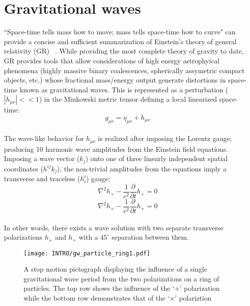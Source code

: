 \section{Gravitational waves}
``Space-time tells mass how to move; mass tells space-time how to curve" can provide a concise and sufficient summarization of Einstein's theory of general relativity (GR) ~\cite{misner:1973}. While providing the most complete theory of gravity to date, GR provides tools that allow considerations of high energy astrophyical phenomena (highly massive binary coalescences, spherically assymetric compact objects, etc.) whose fractional mass/energy output generate distortions in space-time known as gravitational waves.
This is represented as a perturbation ($|h_{\mu \nu}|<<1$) in the Minkowski metric tensor defining a local linearized space-time:
\\
$$g_{\mu \nu} = \eta_{\mu \nu} + h_{\mu \nu}$$
\\
The wave-like behavior for $h_{\mu \nu}$ is realized after imposing the Lorentz gauge; producing 10 harmonic wave amplitudes from the Einstein field equations. Imposing a wave vector ($k_j$) onto one of three linearly independent spatial coordinates ($h^{ij}k_j$), the non-trivial amplitudes from the equations imply a transverse and traceless ($h^{i}_{i}$) gauge:
\\
$$\nabla^2 h_{+} - \frac{1}{c^2} \frac{\partial}{\partial t} h_{+} = 0$$
$$\nabla^2 h_{\times} - \frac{1}{c^2} \frac{\partial}{\partial t} h_{\times} = 0$$
\\
In other words, there exists a wave solution with two separate transverse polarizations $h_{+}$ and $h_{\times}$ with a $45^{\circ}$ separation between them. 

\begin{figure}[H]
	\texttt{[image: INTRO/gw\_particle\_ring1.pdf]}
	\caption{A stop motion pictograph displaying the influence of a single gravitational wave period from the two polarizations on a ring of particles. The top row shows the influence of the `+' polarization while the bottom row demonstrates that of the `$\times$' polariztion}	
	\label{fig:gwpolarizations}
\end{figure}

